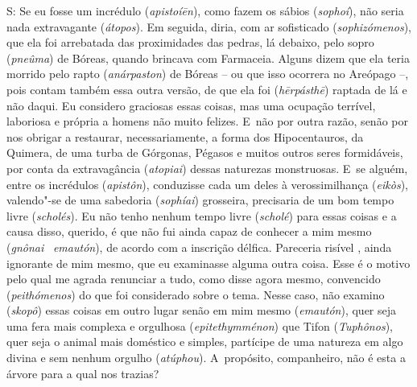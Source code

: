 S: Se eu fosse um incrédulo (\emph{apistoíēn}), como fazem os sábios
(\emph{sophoí}), não seria nada extravagante (\emph{átopos}). Em
seguida, diria, com ar sofisticado (\emph{sophizómenos}), que ela foi
arrebatada das proximidades das pedras, lá debaixo, pelo sopro
(\emph{pneûma}) de Bóreas, quando brincava com Farmaceia. Alguns dizem
que ela teria morrido pelo rapto (\emph{anárpaston}) de Bóreas -- ou que
isso ocorrera no Areópago --, \bekker{[229d]} pois contam também essa outra
versão, de que ela foi (\emph{hērpásthē}) raptada de lá e não daqui. Eu
considero graciosas essas coisas, mas uma ocupação terrível, laboriosa e
própria a homens não muito felizes. E~não por outra razão, senão por nos
obrigar a restaurar, necessariamente, a forma dos Hipocentauros, da
Quimera, de uma turba de Górgonas, Pégasos e muitos \bekker{[229e]} outros
seres formidáveis, por conta da extravagância (\emph{atopiai}) dessas
naturezas monstruosas. E~se alguém, entre os incrédulos
(\emph{apistôn}), conduzisse cada um deles à verossimilhança
(\emph{eikòs}), valendo"-se de uma sabedoria (\emph{sophíai}) grosseira,
precisaria de um bom tempo livre (\emph{scholés}). Eu não tenho nenhum
tempo livre (\emph{scholé}) para essas coisas e a causa disso, querido,
é que não fui ainda capaz de conhecer a mim mesmo (\emph{gnônai}~
\emph{emautón}), de acordo com a inscrição délfica. Pareceria risível \bekker{[230a]}, ainda
ignorante de mim mesmo, que eu examinasse alguma outra coisa. Esse é o
motivo pelo qual me agrada renunciar a tudo, como disse agora mesmo,
convencido (\emph{peithómenos}) do que foi considerado sobre o tema.
Nesse caso, não examino (\emph{skopô}) essas coisas em outro lugar senão
em mim mesmo (\emph{emautón}), quer seja uma fera mais complexa e
orgulhosa (\emph{epitethymménon}) que Tifon (\emph{Tuphônos}), quer seja o animal mais doméstico e simples,
partícipe de uma natureza em algo divina e sem nenhum orgulho
(\emph{atúphou}). A~propósito, companheiro, não é esta a árvore para a
qual nos trazias?

